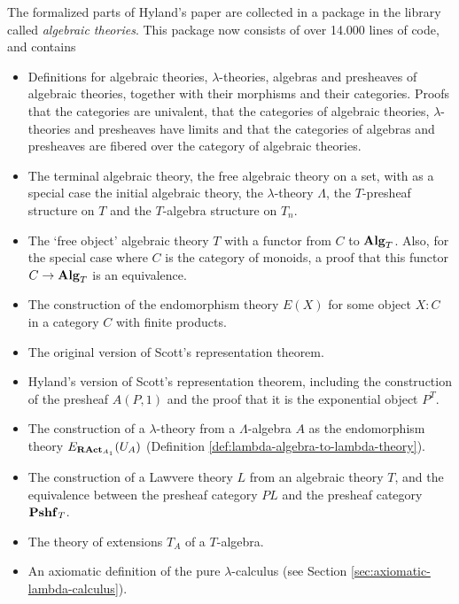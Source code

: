 The formalized parts of Hyland's paper are collected in a package in the library called \textit{algebraic theories}. This package now consists of over 14.000 lines of code, and contains
\begin{itemize}
  \item Definitions for algebraic theories, $ \lambda $-theories, algebras and presheaves of algebraic theories, together with their morphisms and their categories. Proofs that the categories are univalent, that the categories of algebraic theories, $ \lambda $-theories and presheaves have limits and that the categories of algebras and presheaves are fibered over the category of algebraic theories.
  \item The terminal algebraic theory, the free algebraic theory on a set, with as a special case the initial algebraic theory, the $ \lambda $-theory $ \Lambda $, the $ T $-presheaf structure on $ T $ and the $ T $-algebra structure on $ T_n $.
  \item The `free object' algebraic theory $ T $ with a functor from $ C $ to $ \mathbf{Alg}_{T} $. Also, for the special case where $ C $ is the category of monoids, a proof that this functor $ C \to \mathbf{Alg}_{T} $ is an equivalence.
  \item The construction of the endomorphism theory $ E(X) $ for some object $ X : C $ in a category $ C $ with finite products.
  \item The original version of Scott's representation theorem.
  \item Hyland's version of Scott's representation theorem, including the construction of the presheaf $ A(P, 1) $ and the proof that it is the exponential object $ P^T $.
  \item The construction of a $ \lambda $-theory from a $ \Lambda $-algebra $ A $ as the endomorphism theory $ E_{\mathbf{RAct}_{A_1}}(U_A) $ (Definition \ref{def:lambda-algebra-to-lambda-theory}).
  \item The construction of a Lawvere theory $ L $ from an algebraic theory $ T $, and the equivalence between the presheaf category $ PL $ and the presheaf category $ \mathbf{Pshf}_{T} $.
  \item The theory of extensions $ T_A $ of a $ T $-algebra.
  \item An axiomatic definition of the pure $ \lambda $-calculus (see Section \ref{sec:axiomatic-lambda-calculus}).
\end{itemize}


